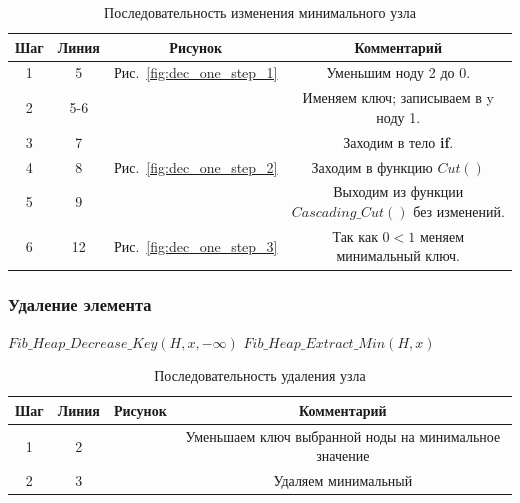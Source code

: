 \documentclass[a4paper,10pt]{article}
\begin{document}
            \begin{table}[h!]
                \caption{Последовательность изменения минимального узла}
    			\center
                \begin{tabular}{|c|c|c|c|}
                    \hline
                    Шаг  & Линия &  Рисунок                       & Комментарий                \\ \hline
					1    &   5   & Рис.~\ref{fig:dec_one_step_1}  & Уменьшим ноду 2 до 0.\\ \hline
					2    &   5-6 &								  & Именяем ключ; записываем в y ноду 1. \\ \hline
					3    &  7    &							      & Заходим в тело \textbf{if}. \\ \hline
					4    &  8    & Рис.~\ref{fig:dec_one_step_2}  & Заходим в функцию $Cut()$ \\ \hline
					5    &  9    & 								  & Выходим из функции $Cascading\_Cut()$ без изменений. \\ \hline
					6    &  12   & Рис.~\ref{fig:dec_one_step_3}  & Так как $0 < 1$ меняем минимальный ключ. \\ \hline 
                \end{tabular}
            \end{table}


        \subsubsection*{Удаление элемента}
            \begin{algorithmic}[1]
                    \State $Fib\_Heap\_Decrease\_Key(H, x,-\infty)$
                    \State $Fib\_Heap\_Extract\_Min(H, x)$
                \EndFunction
            \end{algorithmic}
            \begin{table}[h!]
                \caption{Последовательность удаления узла}
    			\center
                \begin{tabular}{|c|c|c|c|}
                    \hline
                    Шаг  & Линия &  Рисунок                       & Комментарий                \\ \hline
					 1   &  2    &								  & Уменьшаем ключ выбранной ноды на минимальное значение \\ \hline
					 2   &  3    &								  & Удаляем минимальный \\ \hline
                \end{tabular}
            \end{table}
		
\end{document}
